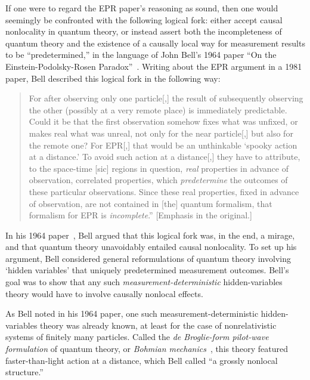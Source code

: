\documentclass[twoside,twocolumn,english,prl,superscriptaddress,nobibnotes,nofootinbib]{revtex4-2}
\begin{document}
If one were to regard the EPR paper's reasoning as sound, then one
would seemingly be confronted with the following logical fork: either
accept causal nonlocality in quantum theory, or instead assert both
the incompleteness of quantum theory and the existence of a causally
local way for measurement results to be ``predetermined,'' in the
language of John Bell's 1964 paper ``On the Einstein-Podolsky-Rosen
Paradox''~\citep{Bell:1964oeprp}. Writing about the EPR argument
in a 1981 paper, Bell described this logical fork in the following
way: 
\begin{quotation}
For after observing only one particle{[},{]} the result of subsequently
observing the other (possibly at a very remote place) is immediately
predictable. Could it be that the first observation somehow fixes
what was unfixed, or makes real what was unreal, not only for the
near particle{[},{]} but also for the remote one? For EPR{[},{]} that
would be an unthinkable \textquoteleft spooky action at a distance.\textquoteright{}
To avoid such action at a distance{[},{]} they have to attribute,
to the space-time {[}sic{]} regions in question, \emph{real} properties
in advance of observation, correlated properties, which \emph{predetermine}
the outcomes of these particular observations. Since these real properties,
fixed in advance of observation, are not contained in {[}the{]} quantum
formalism, that formalism for EPR is \emph{incomplete}.'' {[}Emphasis
in the original.{]}~\citep{Bell:1981bssatnor}
\end{quotation}

In his 1964 paper~\citep{Bell:1964oeprp}, Bell argued that this
logical fork was, in the end, a mirage, and that quantum theory unavoidably
entailed causal nonlocality. To set up his argument, Bell considered
general reformulations of quantum theory involving \textquoteleft hidden
variables\textquoteright{} that uniquely predetermined measurement
outcomes. Bell's goal was to show that any such \emph{measurement-deterministic}
hidden-variables theory would have to involve causally nonlocal effects.

As Bell noted in his 1964 paper, one such measurement-deterministic
hidden-variables theory was already known, at least for the case of
nonrelativistic systems of finitely many particles. Called the \emph{de Broglie-form pilot-wave formulation}
of quantum theory, or \emph{Bohmian mechanics}~\citep{deBroglie:1930iswm,Bohm:1952siqtthvi,Bohm:1952siqtthvii},
this theory featured faster-than-light action at a distance, which
Bell called ``a grossly nonlocal structure.'' 
\end{document}
